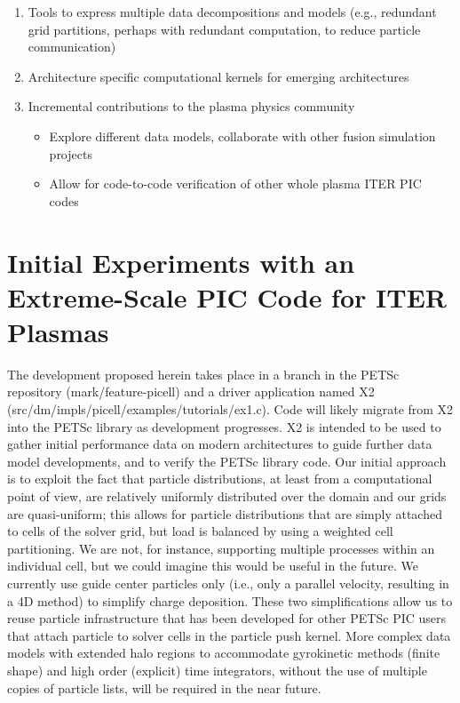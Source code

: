 \documentclass[review]{siamart}
\begin{document}
\begin{itemize}
\begin{enumerate}
\item Tools to express multiple data decompositions and models (e.g., redundant grid partitions, perhaps with redundant computation, to reduce particle communication)
\item Architecture specific computational kernels for emerging architectures \cite{KnepleyBrownMcInnesSmithRuppAdams2015}
\item Incremental contributions to the plasma physics community
\begin{itemize}
\item Explore different data models, collaborate with other fusion simulation projects
\item Allow for code-to-code verification of other whole plasma ITER PIC codes
\end{itemize}
\end{enumerate}
\end{itemize}

\section{Initial Experiments with an Extreme-Scale PIC Code for ITER Plasmas}
\label{sec:x2}

The development proposed herein takes place in a branch in the PETSc repository (mark/feature-picell) and a driver application named X2 (src/dm/impls/picell/examples/tutorials/ex1.c).
Code will likely migrate from X2 into the PETSc library as development progresses.
X2 is intended to be used to gather initial performance data on modern architectures to guide further data model developments, and to verify the PETSc library code.
Our initial approach is to exploit the fact that particle distributions, at least from a computational point of view, are relatively uniformly distributed over the domain and our grids are quasi-uniform; this allows for particle distributions that are simply attached to cells of the solver grid, but load is balanced by using a weighted cell partitioning.
We are not, for instance, supporting multiple processes within an individual cell, but we could imagine this would be useful in the future.
We currently use guide center particles only (i.e., only a parallel velocity, resulting in a 4D method) to simplify charge deposition.
These two simplifications allow us to reuse particle infrastructure that has been developed for other PETSc PIC users \cite{may2014ptatin} that attach particle to solver cells in the particle push kernel.
More complex data models with extended halo regions to accommodate gyrokinetic methods (finite shape) and high order (explicit) time integrators, without the use of multiple copies of particle lists, will be required in the near future.
\end{document}
